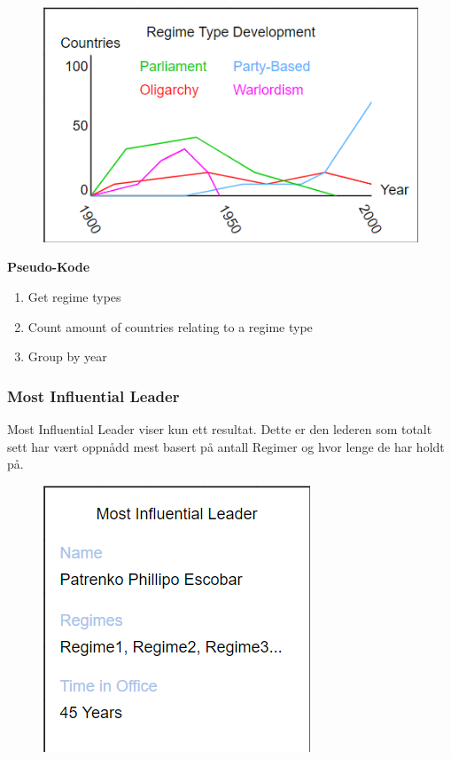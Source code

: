 \FigureCounter
\begin{figure}[H]
  \includegraphics[scale=1]{images/milepael4/regimeTypeDevelopment.png}
\end{figure}

\textbf{Pseudo-Kode}
\begin{enumerate}
  \item Get regime types
  \item Count amount of countries relating to a regime type
  \item Group by year
\end{enumerate}

\subsubsection{Most Influential Leader}
Most Influential Leader viser kun ett resultat. Dette er den lederen som totalt sett har vært oppnådd 
mest basert på antall Regimer og hvor lenge de har holdt på.

\FigureCounter
\begin{figure}[H]
  \includegraphics[scale=1]{images/milepael4/mostInfluentialLeader.png}
\end{figure}

